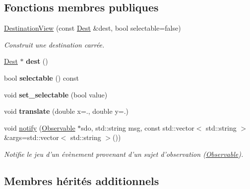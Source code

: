 \subsection*{Fonctions membres publiques}
\begin{DoxyCompactItemize}
\item 
\hyperlink{classDestinationView_ade423541028697f01a4892830471881d}{Destination\+View} (const \hyperlink{classDest}{Dest} \&dest, bool selectable=false)
\begin{DoxyCompactList}\small\item\em Construit une destination carrée. \end{DoxyCompactList}\item 
\hypertarget{classDestinationView_ae8afc4d5eceb09a0d8ff478b20f1fa1d}{\hyperlink{classDest}{Dest} $\ast$ {\bfseries dest} ()}\label{classDestinationView_ae8afc4d5eceb09a0d8ff478b20f1fa1d}

\item 
\hypertarget{classDestinationView_a2193a64a9d58d0faa80fa5c0541af638}{bool {\bfseries selectable} () const }\label{classDestinationView_a2193a64a9d58d0faa80fa5c0541af638}

\item 
\hypertarget{classDestinationView_a8e3dd1c269161b43a4b903092550ba5d}{void {\bfseries set\+\_\+selectable} (bool value)}\label{classDestinationView_a8e3dd1c269161b43a4b903092550ba5d}

\item 
\hypertarget{classDestinationView_aa3efb1f232a1e459b270ce047bc94796}{void {\bfseries translate} (double x=., double y=.)}\label{classDestinationView_aa3efb1f232a1e459b270ce047bc94796}

\item 
void \hyperlink{classDestinationView_a2db4a98a3103b3b8aeaf6ae5a56847a7}{notify} (\hyperlink{classObservable}{Observable} $\ast$sdo, std\+::string msg, const std\+::vector$<$ std\+::string $>$ \&args=std\+::vector$<$ std\+::string $>$())
\begin{DoxyCompactList}\small\item\em Notifie le jeu d'un évènement provenant d'un sujet d'observation (\hyperlink{classObservable}{Observable}). \end{DoxyCompactList}\end{DoxyCompactItemize}
\subsection*{Membres hérités additionnels}


